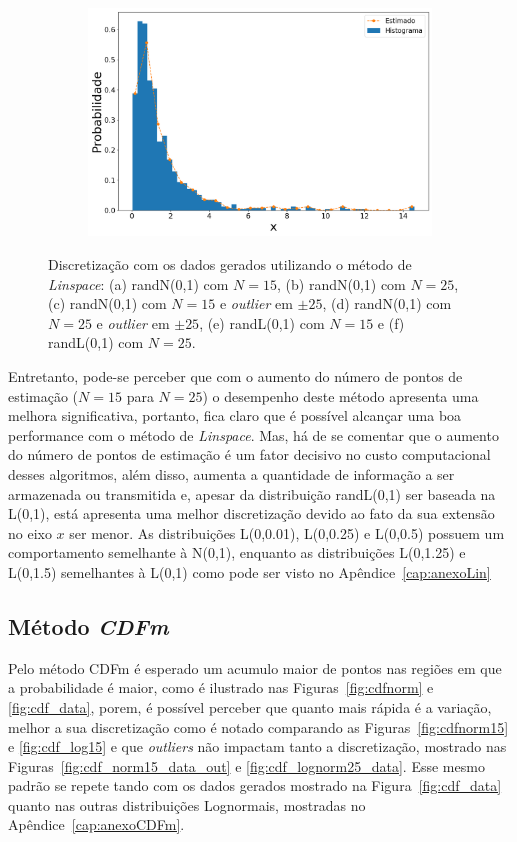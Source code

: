\begin{figure}[H]
\begin{subfigure}[b]{0.45\textwidth}
		\includegraphics[width=\linewidth]{./figuras/Linspace_lognormal_25_1000}
		\caption{}
		\label{fig:lin_lognorm25_data}
	\end{subfigure}
	\caption{Discretização com os dados gerados utilizando o método de \textit{Linspace}: (a) randN(0,1) com $N = 15$, (b) randN(0,1) com $N = 25$, (c) randN(0,1) com $N = 15$ e \textit{outlier} em $\pm 25$, (d) randN(0,1) com $N = 25$ e \textit{outlier} em $\pm 25$, (e) randL(0,1) com $ N = 15 $ e (f) randL(0,1) com $ N = 25 $.}
	\label{fig:lin_data}
\end{figure}

Entretanto, pode-se perceber que com o aumento do número de pontos de estimação ($N = 15$ para $N = 25$) o desempenho deste método apresenta uma melhora significativa, portanto, fica claro que é possível alcançar uma boa performance com o método de \textit{Linspace}. Mas, há de se comentar que o aumento do número de pontos de estimação é um fator decisivo no custo computacional desses algoritmos, além disso, aumenta a quantidade de informação a ser armazenada ou transmitida e, apesar da distribuição randL(0,1) ser baseada na L(0,1), está apresenta uma melhor discretização devido ao fato da sua extensão no eixo $ x $ ser menor. As distribuições L(0,0.01), L(0,0.25) e L(0,0.5) possuem um comportamento semelhante à N(0,1), enquanto as distribuições L(0,1.25) e L(0,1.5) semelhantes à L(0,1) como pode ser visto no Apêndice~\ref{cap:anexoLin}

\subsection{Método \textit{CDFm}}

Pelo método \ac{CDFm} é esperado um acumulo maior de pontos nas regiões em que a probabilidade é maior, como é ilustrado nas Figuras~\ref{fig:cdfnorm} e \ref{fig:cdf_data}, porem, é possível perceber que quanto mais rápida é a variação, melhor a sua discretização como é notado comparando as Figuras~\ref{fig:cdfnorm15} e \ref{fig:cdf_log15} e que \textit{outliers} não impactam tanto a discretização, mostrado nas Figuras~\ref{fig:cdf_norm15_data_out} e \ref{fig:cdf_lognorm25_data}. Esse mesmo padrão se repete tando com os dados gerados mostrado na Figura~\ref{fig:cdf_data} quanto nas outras distribuições Lognormais, mostradas no Apêndice~\ref{cap:anexoCDFm}.

